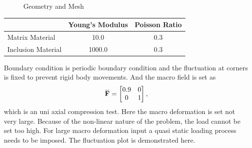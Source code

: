 \documentclass[10pt,a4paper]{scrreprt}
\newcommand{\overbar}[1]{\mkern 1.5mu\overline{\mkern-1.5mu#1\mkern-1.5mu}\mkern 1.5mu}
\begin{document}
\begin{figure}[h]
  \centering
  \caption{Geometry and Mesh}
  \label{fig: inc}
\end{figure} 

\begin{center}
\begin{tabular}{l|c|c}
\hline
& Young's Modulus & Poisson Ratio \\
\hline
Matrix Material & 10.0 & 0.3 \\
Inclusion Material & 1000.0 & 0.3 \\
\hline
\end{tabular}
\end{center}
Boundary condition is periodic boundary condition and the fluctuation at corners is fixed to prevent rigid body movements. And the macro field is set as 
\[
\overbar{\mathbf{F}} = 
\begin{bmatrix}
0.9 & 0 \\
0 & 1 \\
\end{bmatrix},
\]
which is an uni axial compression test. Here the macro deformation is set not very large. Because of the non-linear nature of the problem, the load cannot be set too high. For large macro deformation input a quasi static loading process needs to be imposed. The fluctuation plot is demonstrated here.
\end{document}
